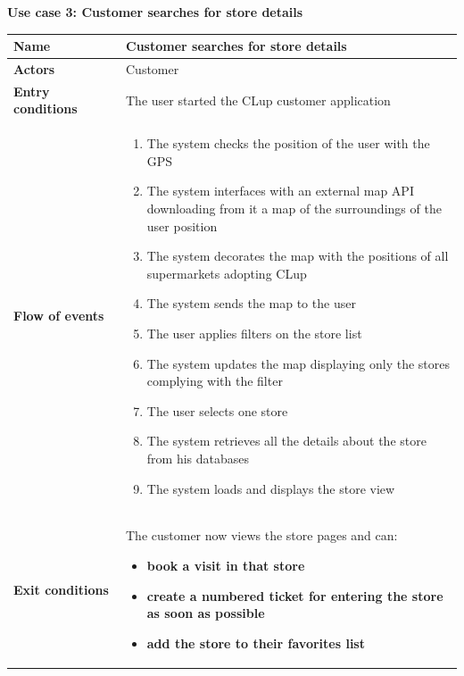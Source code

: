 \clearpage
\textbf{Use case 3: Customer searches for store details}
\smallskip
{}
\begin{longtable}{p{0.25\linewidth}p{0.75\linewidth}}
    \toprule
    \textbf{Name}                             & \textbf{Customer searches for store details}      \\
    \midrule
    \textbf{Actors}                           & Customer                                          \\
    \midrule
    \textbf{Entry conditions}                 & The user started the CLup customer application    \\
    \midrule
    \textbf{Flow of events}                   &
    \begin{enumerate}
        \item The system checks the position of the user with the GPS
        \item The system interfaces with an external map API downloading from it a map of the surroundings of the user position
        \item The system decorates the map with the positions of all supermarkets adopting CLup
        \item The system sends the map to the user
        \item The user applies filters on the store list
        \item The system updates the map displaying only the stores complying with the filter
        \item The user selects one store
        \item The system retrieves all the details about the store from his databases
        \item The system loads and displays the store view
    \end{enumerate}                                                                     \\
    \midrule
    \textbf{Exit conditions}                  & The customer now views the store pages and can:
    \begin{itemize}
        \item \textbf{book a visit in that store}
        \item \textbf{create a numbered ticket for entering the store as soon as possible}
        \item \textbf{add the store to their favorites list}
    \end{itemize}                                                                    \\

\end{longtable}
